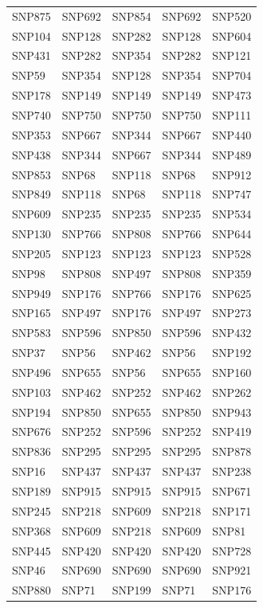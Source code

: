 \begin{table}[ht]
\begin{tabular}{lllll}
  SNP875 & SNP692 & SNP854 & SNP692 & SNP520 \\ 
  SNP104 & SNP128 & SNP282 & SNP128 & SNP604 \\ 
  SNP431 & SNP282 & SNP354 & SNP282 & SNP121 \\ 
  SNP59 & SNP354 & SNP128 & SNP354 & SNP704 \\ 
  SNP178 & SNP149 & SNP149 & SNP149 & SNP473 \\ 
  SNP740 & SNP750 & SNP750 & SNP750 & SNP111 \\ 
  SNP353 & SNP667 & SNP344 & SNP667 & SNP440 \\ 
  SNP438 & SNP344 & SNP667 & SNP344 & SNP489 \\ 
  SNP853 & SNP68 & SNP118 & SNP68 & SNP912 \\ 
  SNP849 & SNP118 & SNP68 & SNP118 & SNP747 \\ 
  SNP609 & SNP235 & SNP235 & SNP235 & SNP534 \\ 
  SNP130 & SNP766 & SNP808 & SNP766 & SNP644 \\ 
  SNP205 & SNP123 & SNP123 & SNP123 & SNP528 \\ 
  SNP98 & SNP808 & SNP497 & SNP808 & SNP359 \\ 
  SNP949 & SNP176 & SNP766 & SNP176 & SNP625 \\ 
  SNP165 & SNP497 & SNP176 & SNP497 & SNP273 \\ 
  SNP583 & SNP596 & SNP850 & SNP596 & SNP432 \\ 
  SNP37 & SNP56 & SNP462 & SNP56 & SNP192 \\ 
  SNP496 & SNP655 & SNP56 & SNP655 & SNP160 \\ 
  SNP103 & SNP462 & SNP252 & SNP462 & SNP262 \\ 
  SNP194 & SNP850 & SNP655 & SNP850 & SNP943 \\ 
  SNP676 & SNP252 & SNP596 & SNP252 & SNP419 \\ 
  SNP836 & SNP295 & SNP295 & SNP295 & SNP878 \\ 
  SNP16 & SNP437 & SNP437 & SNP437 & SNP238 \\ 
  SNP189 & SNP915 & SNP915 & SNP915 & SNP671 \\ 
  SNP245 & SNP218 & SNP609 & SNP218 & SNP171 \\ 
  SNP368 & SNP609 & SNP218 & SNP609 & SNP81 \\ 
  SNP445 & SNP420 & SNP420 & SNP420 & SNP728 \\ 
  SNP46 & SNP690 & SNP690 & SNP690 & SNP921 \\ 
  SNP880 & SNP71 & SNP199 & SNP71 & SNP176 \\ 

\end{tabular}
\end{table}
